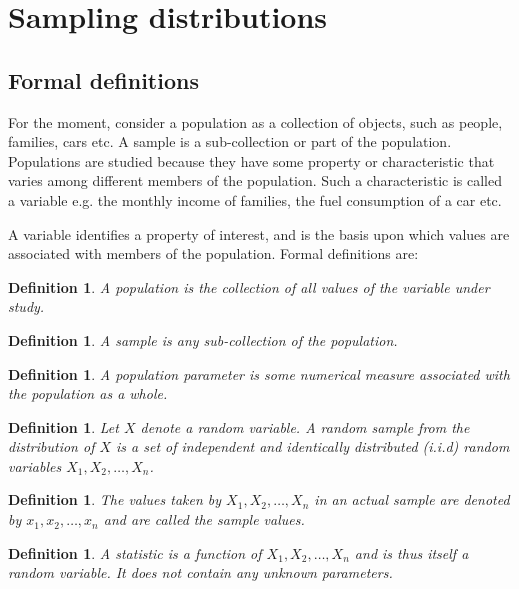 \documentclass[12pt]{article}
\theoremstyle{break}
\newtheorem{definition}[theorem]{Definition}
\begin{document}
\newpage
\section{Sampling distributions}
\subsection{Formal definitions}
For the moment, consider a population as a collection of objects, such as people, families, cars etc.  A sample is a sub-collection or part of the population.  Populations are studied because they have some property or characteristic that varies among different members of the population.  Such a characteristic is called a variable e.g. the monthly income of families, the fuel consumption of a car etc.

A variable identifies a property of interest, and is the basis upon which values are associated with members of the population.  Formal definitions are:
\begin{definition}
A \emph{population} is the collection of all values of the variable under study.
\end{definition}
\begin{definition}
A \emph{sample} is any sub-collection of the population.
\end{definition}
\begin{definition}
A \emph{population parameter} is some numerical measure associated with the population as a whole.
\end{definition}
\begin{definition}
Let $X$ denote a random variable. A \emph{random sample from the distribution} of $X$   is a set of independent and identically distributed (i.i.d) random variables $X_{1},X_{2},\ldots,X_{n}$.
\end{definition}
\begin{definition}
The values taken by $X_{1},X_{2},\ldots,X_{n}$ in an actual sample are denoted by $x_{1},x_{2},\ldots,x_{n}$ and are called the \emph{sample values}.
\end{definition}
\begin{definition}
A \emph{statistic} is a function of $X_{1},X_{2},\ldots,X_{n}$  and is thus itself a random variable.  It does not contain any unknown parameters.
\end{definition}
\end{document}
